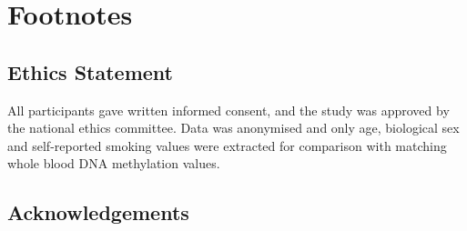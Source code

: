 \documentclass[draft]{article}
\begin{document}

\section{Footnotes}

\subsection{Ethics Statement}
All participants gave written informed consent, and the study was approved by the national ethics committee. Data was anonymised and only age, biological sex and self-reported smoking values were extracted for comparison with matching whole blood DNA methylation values.

\subsection{Acknowledgements}

\printbibliography
\end{document}
